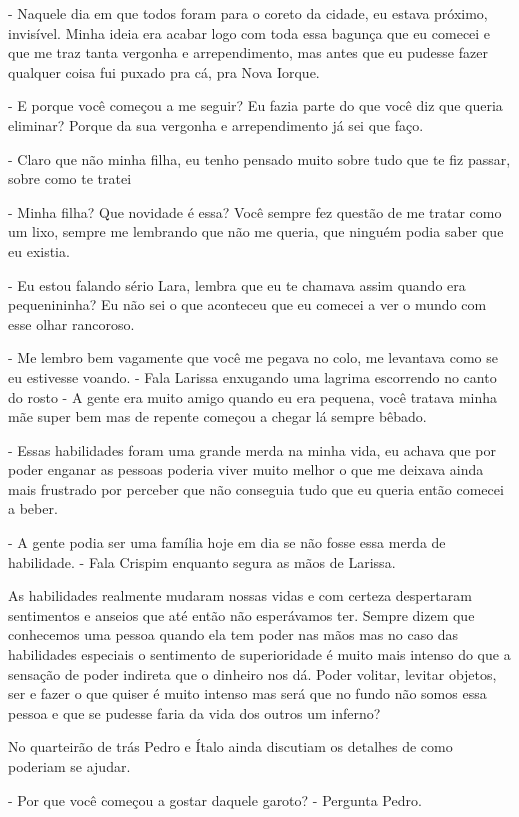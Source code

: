 - Naquele dia em que todos foram para o coreto da cidade, eu estava próximo, invisível. Minha ideia era acabar logo com toda essa bagunça que eu comecei e que me traz tanta vergonha e arrependimento, mas antes que eu pudesse fazer qualquer coisa fui puxado pra cá, pra Nova Iorque.

- E porque você começou a me seguir? Eu fazia parte do que você diz que queria eliminar? Porque da sua vergonha e arrependimento já sei que faço.

- Claro que não minha filha, eu tenho pensado muito sobre tudo que te fiz passar, sobre como te tratei

- Minha filha? Que novidade é essa? Você sempre fez questão de me tratar como um lixo, sempre me lembrando que não me queria, que ninguém podia saber que eu existia.

- Eu estou falando sério Lara, lembra que eu te chamava assim quando era pequenininha? Eu não sei o que aconteceu que eu comecei a ver o mundo com esse olhar rancoroso.

- Me lembro bem vagamente que você me pegava no colo, me levantava como se eu estivesse voando. - Fala Larissa enxugando uma lagrima escorrendo no canto do rosto - A gente era muito amigo quando eu era pequena, você tratava minha mãe super bem mas de repente começou a chegar lá sempre bêbado.

- Essas habilidades foram uma grande merda na minha vida, eu achava que por poder enganar as pessoas poderia viver muito melhor o que me deixava ainda mais frustrado por perceber que não conseguia tudo que eu queria então comecei a beber.

- A gente podia ser uma família hoje em dia se não fosse essa merda de habilidade. - Fala Crispim enquanto segura as mãos de Larissa.

As habilidades realmente mudaram nossas vidas e com certeza despertaram sentimentos e anseios que até então não esperávamos ter. Sempre dizem que conhecemos uma pessoa quando ela tem poder nas mãos mas no caso das habilidades especiais o sentimento de superioridade é muito mais intenso do que a sensação de poder indireta que o dinheiro nos dá. Poder volitar, levitar objetos, ser e fazer o que quiser é muito intenso mas será que no fundo não somos essa pessoa e que se pudesse faria da vida dos outros um inferno?

No quarteirão de trás Pedro e Ítalo ainda discutiam os detalhes de como poderiam se ajudar.

- Por que você começou a gostar daquele garoto? - Pergunta Pedro.

